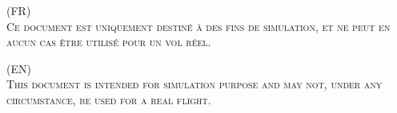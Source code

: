 %
%
%
%



   


%
\begin{smini}
\center
\textsc{{\Huge (FR)\\ Ce document est uniquement destiné à des fins de simulation, et ne peut en aucun cas être utilisé pour un vol réel.}}

\vskip2cm

\textsc{{\Huge (EN)\\ This document is intended for simulation purpose and may not, under any circumstance, be used for a real flight.}}
\end{smini}





%